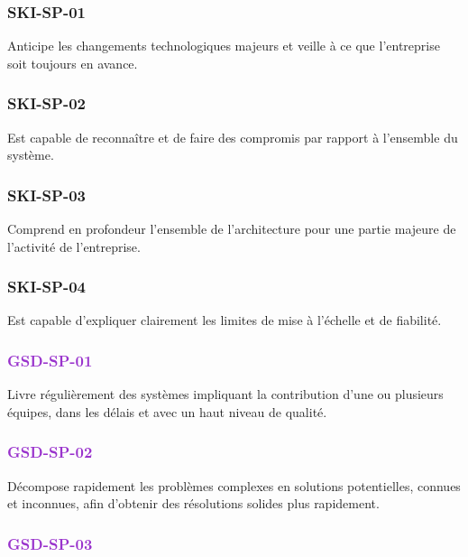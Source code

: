\documentclass[a4paper, french, openany, 12pt]{book}
\newcommand\dex[1]{\textcolor{BrickRed}{\textbf{\uppercase{ski-{#1}}}}}
\newcommand\str[1]{\textcolor{DarkOrchid}{\textbf{\uppercase{gsd-{#1}}}}}
\begin{document}
\begin{multicols}{2}

  \subsubsection*{\dex{sp-01}}

  Anticipe les changements technologiques majeurs et veille à ce que l'entreprise soit toujours en avance.

  \subsubsection*{\dex{sp-02}}

  Est capable de reconnaître et de faire des compromis par rapport à l'ensemble du système.
  
  \subsubsection*{\dex{sp-03}}

  Comprend en profondeur l'ensemble de l'architecture pour une partie majeure de l'activité de l'entreprise.
  
  \subsubsection*{\dex{sp-04}}

  Est capable d'expliquer clairement les limites de mise à l'échelle et de fiabilité.

  \subsubsection*{\str{sp-01}}

  Livre régulièrement des systèmes impliquant la contribution d'une ou plusieurs équipes, dans les délais et avec un haut 
  niveau de qualité.

  \subsubsection*{\str{sp-02}}

  Décompose rapidement les problèmes complexes en solutions potentielles, connues et inconnues, afin d'obtenir des 
  résolutions solides plus rapidement.

  \subsubsection*{\str{sp-03}}


\end{multicols}
\end{document}
